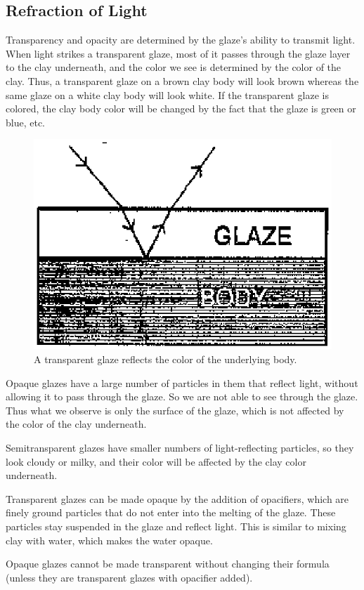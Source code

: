 \subsection{Refraction of Light}
Transparency and opacity are determined by the glaze's ability to transmit 
light. When light strikes a transparent glaze, most of it passes through the 
glaze layer to the clay underneath, and the color we see is determined by the 
color of the clay. Thus, a transparent glaze on a brown clay body will look 
brown whereas the same glaze on a white clay body will look white. If the 
transparent glaze is colored, the clay body color will be changed by the fact 
that the glaze is green or blue, etc.
\begin{figure}[htbp!]
  \centering
  \includegraphics[width=0.5\linewidth]{img/reflecting.eps}
  \caption{A transparent glaze reflects the color of the underlying body.}
  \label{fig:reflecting}
\end{figure}
Opaque glazes have a large number of particles in them that reflect light, 
without allowing it to pass through the glaze. So we are not able to see 
through the glaze. Thus what we observe is only the surface of the glaze, which 
is not affected by the color of the clay underneath.

Semitransparent glazes have smaller numbers of light-reflecting particles, so 
they look cloudy or milky, and their color will be affected by the clay color 
underneath.

Transparent glazes can be made opaque by the addition of opacifiers, which are 
finely ground particles that do not enter into the melting of the glaze. These 
particles stay suspended in the glaze and reflect light. This is similar to 
mixing clay with water, which makes the water opaque.

Opaque glazes cannot be made transparent without changing their formula (unless 
they are transparent glazes with opacifier added).

